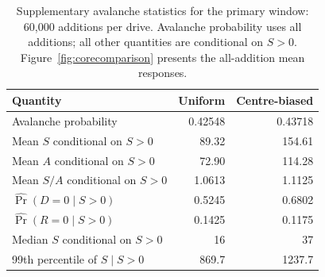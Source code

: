 \begin{table}[htbp]
\centering
\caption{Supplementary avalanche statistics for the primary window: 60,000 additions per drive. Avalanche probability uses all additions; all other quantities are conditional on $S>0$. Figure~\ref{fig:corecomparison} presents the all-addition mean responses.}
\label{tab:metrics}
\begin{tabular}{@{}lrr@{}}
\toprule
Quantity & Uniform & Centre-biased\\
\midrule
Avalanche probability & 0.42548 & 0.43718\\
Mean $S$ conditional on $S>0$ & 89.32 & 154.61\\
Mean $A$ conditional on $S>0$ & 72.90 & 114.28\\
Mean $S/A$ conditional on $S>0$ & 1.0613 & 1.1125\\
$\widehat{\Pr}(D=0\mid S>0)$ & 0.5245 & 0.6802\\
$\widehat{\Pr}(R=0\mid S>0)$ & 0.1425 & 0.1175\\
Median $S$ conditional on $S>0$ & 16 & 37\\
99th percentile of $S\mid S>0$ & 869.7 & 1237.7\\
\bottomrule
\end{tabular}
\end{table}
